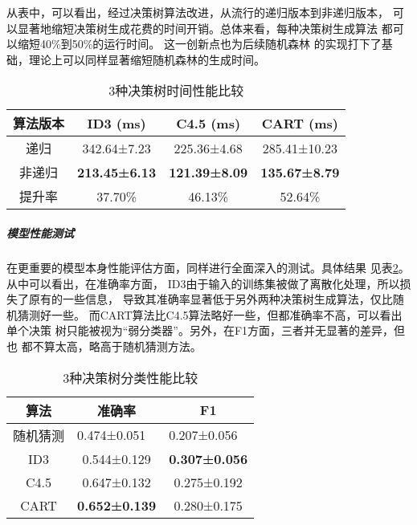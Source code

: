\documentclass[main.tex]{subfiles}
\begin{document}
从表中，可以看出，经过决策树算法改进，从流行的递归版本到非递归版本，
可以显著地缩短决策树生成花费的时间开销。总体来看，每种决策树生成算法
都可以缩短40\%到50\%的运行时间。
这一创新点也为后续随机森林
的实现打下了基础，理论上可以同样显著缩短随机森林的生成时间。
\begin{table}[]
    \caption{3种决策树时间性能比较}
    \label{dt_time_compare}
    \centering
    \begin{tabular}{cccc}
    \hline
    算法版本 & ID3 (ms)             & C4.5 (ms)            & CART (ms)            \\ \hline
    递归   & 342.64±7.23          & 225.36±4.68          & 285.41±10.23         \\
    非递归  & \textbf{213.45±6.13} & \textbf{121.39±8.09} & \textbf{135.67±8.79} \\ \hline
    提升率  & 37.70\%              & 46.13\%              & 52.64\%              \\ \hline
    \end{tabular}
\end{table}


\subparagraph{模型性能测试}
在更重要的模型本身性能评估方面，同样进行全面深入的测试。具体结果
见表\ref{dt_perfor_compare}。从中可以看出，在准确率方面，
ID3由于输入的训练集被做了离散化处理，所以损失了原有的一些信息，
导致其准确率显著低于另外两种决策树生成算法，仅比随机猜测好一些。
而CART算法比C4.5算法略好一些，但都准确率不高，可以看出单个决策
树只能被视为“弱分类器”。另外，在F1方面，三者并无显著的差异，但也
都不算太高，略高于随机猜测方法。

\begin{table}[]
    \caption{3种决策树分类性能比较}
    \label{dt_perfor_compare}
    \centering
    \begin{tabular}{ccc}
    \hline
    算法                       & 准确率                             & F1                                       \\ \hline
    \multicolumn{1}{l}{随机猜测} & \multicolumn{1}{l}{0.474±0.051} & \multicolumn{1}{l}{{0.207±0.056}} \\
    ID3                      & 0.544±0.129                     & \textbf{0.307±0.056}                              \\
    C4.5                     & 0.647±0.132                     & 0.275±0.192                              \\
    CART                     & \textbf{0.652±0.139}            & 0.280±0.175                              \\ \hline
    \end{tabular}
\end{table}
\end{document}
